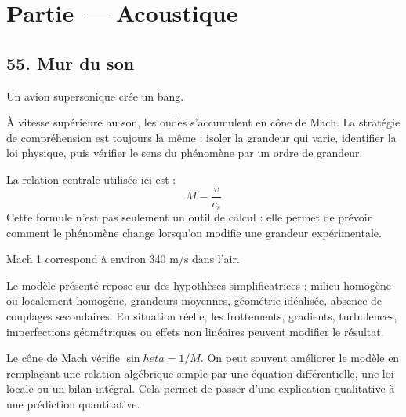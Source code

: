 \documentclass[11pt,a4paper]{article}
\begin{document}
\section{Partie — Acoustique}


\subsection{55. Mur du son}

\begin{exemplebox}
Un avion supersonique crée un bang.
\end{exemplebox}

\begin{methodebox}
À vitesse supérieure au son, les ondes s'accumulent en cône de Mach.
La stratégie de compréhension est toujours la même : isoler la grandeur qui varie, identifier la loi physique, puis vérifier le sens du phénomène par un ordre de grandeur.
\end{methodebox}

\begin{theorembox}
La relation centrale utilisée ici est :
\[
M=\frac{v}{c_s}
\]
Cette formule n'est pas seulement un outil de calcul : elle permet de prévoir comment le phénomène change lorsqu'on modifie une grandeur expérimentale.
\end{theorembox}

\begin{odgbox}
Mach 1 correspond à environ 340 m/s dans l'air.
\end{odgbox}

\begin{attentionbox}
Le modèle présenté repose sur des hypothèses simplificatrices : milieu homogène ou localement homogène, grandeurs moyennes, géométrie idéalisée, absence de couplages secondaires. En situation réelle, les frottements, gradients, turbulences, imperfections géométriques ou effets non linéaires peuvent modifier le résultat.
\end{attentionbox}

\begin{approfondissementbox}
Le cône de Mach vérifie $\sin	heta=1/M$.
On peut souvent améliorer le modèle en remplaçant une relation algébrique simple par une équation différentielle, une loi locale ou un bilan intégral. Cela permet de passer d'une explication qualitative à une prédiction quantitative.
\end{approfondissementbox}
\end{document}
